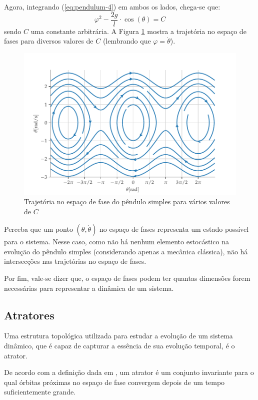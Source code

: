 \documentclass[a4paper, 12pt]{article}
\begin{document}
Agora, integrando (\ref{eq:pendulum-4}) em ambos os lados, chega-se que:
\begin{equation}
\varphi^2 - \frac{2g}{l} \cdot \cos(\theta) = C
\end{equation}
sendo $C$ uma constante arbitrária. A Figura \ref{fig:pendulum-phase-space} mostra a trajetória no espaço de fases para diversos valores de $C$ (lembrando que $\varphi = \dot{\theta}$).
\begin{figure}[!ht]
\centering
\includegraphics[scale = 0.7]{pendulum-phase-space.pdf}
\caption{Trajetória no espaço de fase do pêndulo simples para vários valores de $C$}
\label{fig:pendulum-phase-space}
\end{figure}

Perceba que um ponto $(\theta, \dot{\theta})$ no espaço de fases representa um estado possível para o sistema. Nesse caso, como não há nenhum elemento estocástico na evolução do pêndulo simples (considerando apenas a mecânica clássica), não há intersecções nas trajetórias no espaço de fases. 

Por fim, vale-se dizer que, o espaço de fases podem ter quantas dimensões forem necessárias para representar a dinâmica de um sistema. 

\subsection{Atratores}
Uma estrutura topológica utilizada para estudar a evolução de um sistema dinâmico, que é capaz de capturar a essência de sua evolução temporal, é o atrator.

De acordo com a definição dada em \cite{fiedler1994caos}, um atrator é um conjunto invariante para o qual órbitas próximas no espaço de fase convergem depois de um tempo suficientemente grande.
\end{document}
